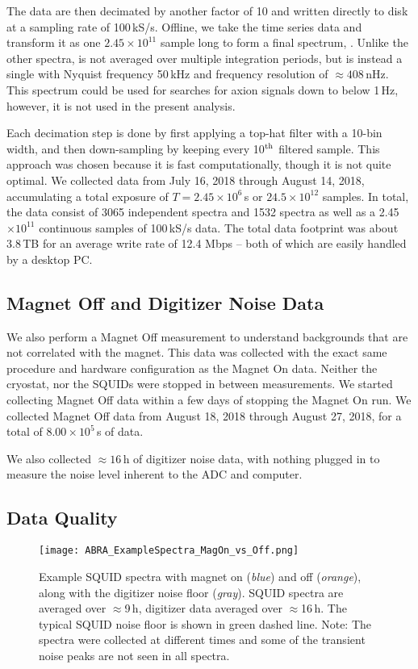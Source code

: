 \documentclass[aps,prd,amsmath,amssymb,reprint,superscriptaddress, nofootinbib,
]{revtex4-1}
\begin{document}
The data are then decimated by another factor of 10 and written directly to disk at a sampling rate of 100\,kS/s. Offline, we take the time series data and transform it as one $2.45\times10^{11}$ sample long \DFT to form a final spectrum, \Phun. Unlike the other spectra, \Phun is not averaged over multiple integration periods, but is instead a single \PSD with Nyquist frequency 50\,kHz and frequency resolution of $\approx408$\,nHz. This spectrum could be used for searches for axion signals down to below 1\,Hz, however, it is not used in the present analysis.

Each decimation step is done by first applying a top-hat filter with a 10-bin width, and then down-sampling by keeping every 10$^{\rm th}$ filtered sample. This approach was chosen because it is fast computationally, though it is not quite optimal. 
We collected data from July 16, 2018 through August 14, 2018, accumulating a total exposure of $T=2.45\times10^6$\,s or $24.5\times10^{12}$ samples. In total, the data consist of 3065 independent \Pten spectra and 1532 \Pone spectra as well as a 2.45$\times10^{11}$ continuous samples of 100\,kS/s data.
The total data footprint was about 3.8\,TB for an average write rate of 12.4 Mbps -- both of which are easily handled by a desktop PC.

\subsection{Magnet Off and Digitizer Noise Data}
\label{sec:MagnetOff}

We also perform a Magnet Off measurement to understand backgrounds that are not correlated with the magnet. This data was collected with the exact same procedure and hardware configuration as the Magnet On data. Neither the cryostat, nor the SQUIDs were stopped in between measurements. We started collecting Magnet Off data within a few days of stopping the Magnet On run. We collected Magnet Off data from August 18, 2018 through August 27, 2018, for a total of $8.00\times10^5$\,s of data.

We also collected $\approx16$\,h of digitizer noise data, with nothing plugged in to measure the noise level inherent to the ADC and computer.

\subsection{Data Quality}
\label{sec:DataQuality}

\begin{figure}
\centering
\texttt{[image: ABRA\_ExampleSpectra\_MagOn\_vs\_Off.png]}
\caption{Example \Pten SQUID spectra with magnet on (\emph{blue}) and off (\emph{orange}), along with the digitizer noise floor (\emph{gray}). SQUID spectra are averaged over $\approx$9\,h, digitizer data averaged over $\approx$16\,h. The typical SQUID noise floor is shown in green dashed line. Note: The spectra were collected at different times and some of the transient noise peaks are not seen in all spectra.}
\label{fig:ExampleSpectrum}
\end{figure}
\end{document}
